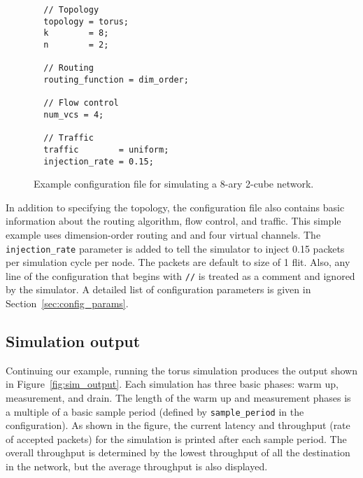 \documentclass[11pt]{article}
\begin{document}
\begin{figure}
\begin{verbatim}
  // Topology
  topology = torus;
  k        = 8;
  n        = 2;

  // Routing
  routing_function = dim_order;

  // Flow control
  num_vcs = 4;

  // Traffic
  traffic        = uniform;
  injection_rate = 0.15;
\end{verbatim}
\caption{Example configuration file for simulating a 8-ary 2-cube
network.}
\label{fig:config_example}
\end{figure}

In addition to specifying the topology, the configuration file also
contains basic information about the routing algorithm, flow control,
and traffic.  This simple example uses dimension-order routing and and four
virtual channels.  The \texttt{injection\_rate} parameter
is added to tell the simulator to inject 0.15 packets per simulation
cycle per node.  The packets are default to size of 1 flit.  Also, any line of the configuration
that begins with \texttt{//} is treated as a comment and ignored by
the simulator.  A detailed list of configuration parameters is given in
Section~\ref{sec:config_params}.

\subsection{Simulation output}

Continuing our example, running the torus simulation produces the
output shown in Figure~\ref{fig:sim_output}.  Each simulation has
three basic phases: warm up, measurement, and drain.  The length of
the warm up and measurement phases is a multiple of a basic sample
period (defined by \texttt{sample\_period} in the configuration).  As
shown in the figure, the current latency and throughput (rate of
accepted packets) for the simulation is printed after each sample
period.  The overall throughput is determined by the lowest throughput
of all the destination in the network, but the average throughput is
also displayed.
\end{document}
